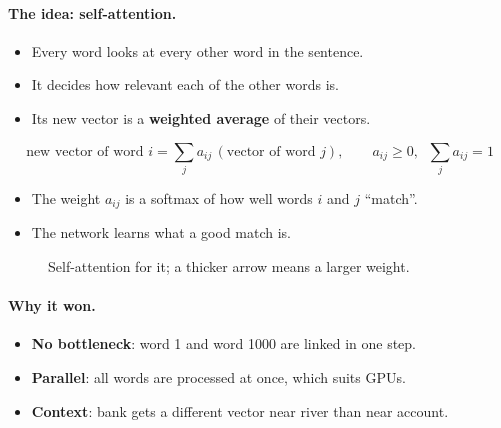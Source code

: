 \documentclass[12pt, a4paper]{article}
\newcommand{\tok}[1]{\textsf{#1}}   %
\begin{document}
\paragraph{The idea: self-attention.}
\begin{itemize}
  \item Every word looks at every other word in the sentence.
  \item It decides how relevant each of the other words is.
  \item Its new vector is a \textbf{weighted average} of their vectors.
\end{itemize}

\begin{resultbox}
  \[
    \text{new vector of word } i
    = \sum_{j} a_{ij}\,(\text{vector of word } j),
    \qquad a_{ij} \ge 0,\;\; \sum_j a_{ij} = 1
  \]
  \begin{itemize}
    \item The weight $a_{ij}$ is a softmax of how well words $i$ and $j$
          ``match''.
    \item The network learns what a good match is.
  \end{itemize}
\end{resultbox}

\begin{figure}[H]
  \centering
  \caption{Self-attention for \tok{it}; a thicker arrow means a larger
    weight.}
  \label{fig:attention}
\end{figure}

\paragraph{Why it won.}
\begin{itemize}
  \item \textbf{No bottleneck}: word 1 and word 1000 are linked in one step.
  \item \textbf{Parallel}: all words are processed at once, which suits GPUs.
  \item \textbf{Context}: \tok{bank} gets a different vector near
        \tok{river} than near \tok{account}.
\end{itemize}
\end{document}
